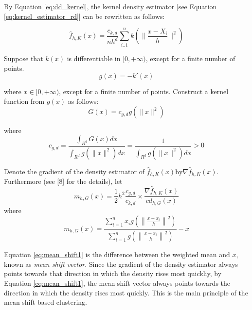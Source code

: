 By Equation \eqref{eq:dd_kernel}, the kernel density estimator [see Equation \eqref{eq:kernel_estimator_rd}] can be rewritten as follows:

\begin{equation}\label{eq:label}
	\hat{f}_{h,K}(x) = \frac{c_{k,d}}{nh^d}\sum_{i_=1}^n k(\lVert \frac{x-X_i}{h} \rVert^2)
\end{equation}

Suppose that $k(x)$ is differentiable in $[0, +\infty)$, except for a finite 
number of points.
\begin{equation*}\label{eq:shadow_kernel}
	g(x) = -k\prime(x)
\end{equation*}

where $x\in [0, +\infty)$, except for a finite number of points. Construct a 
kernel function from $g(x)$ as follows:
\begin{equation*}\label{eq:shadow_kernel1}
	G(x) = c_{g,d}g(\lVert x \rVert^2)
\end{equation*}

where
\begin{equation}\label{eq:shadow_constant}
	c_{g,d} = \frac{\int_{R^d} G(x) dx} {\int_{R^d} g(\lVert x \rVert^2) dx} = \frac{1}{\int_{R^d} g(\lVert x \rVert^2) dx} > 0
\end{equation}

Denote the gradient of the density estimator of $\hat{f}_{h,K}(x) \text{by} \nabla \hat{f}_{h,K}(x)$. Furthermore (see [8] for the details), let 
\begin{equation}\label{eq:mean_shift0}
	m_{h,G}(x) = \frac{1}{2}h^2 \frac{c_{g,d}}{c_{k,d}} \times \frac{\nabla \hat{f}_{h,K}(x)}{cd_{h,G}(x)}
\end{equation}
where
\begin{equation}\label{eq:mean_shift1}
	m_{h,G}(x) = \frac{\sum_{i=1}^n x_i g\left(\left\lVert \frac{x - x_i}{h} \right\rVert^2\right)}{\sum_{i=1}^n g\left(\left\lVert \frac{x - x_i}{h} \right\rVert^2\right)} -x
\end{equation}

Equation \eqref{eq:mean_shift1} is the difference between the weighted mean and
$x$, known as \emph{mean shift vector}. Since the gradient of the density estimator always points towards that direction in which the density rises most quickliy, by Equation \eqref{eq:mean_shift1}, the mean shift vector always points towards the direction in which the density rises most quickly. This is the main principle of the mean shift based clustering. 


